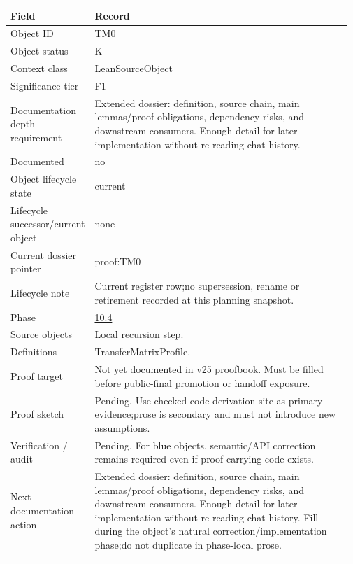 \begin{longtable}{L{0.16\linewidth} L{0.81\linewidth}}
\hline
\textbf{Field} & \textbf{Record}\\
\hline
Object ID & \hyperlink{object-row-TM0}{TM0}\\
\hline\addlinespace[0.20em]
Object status & K\\
\hline\addlinespace[0.20em]
Context class & LeanSourceObject\\
\hline\addlinespace[0.20em]
Significance tier & F1\\
\hline\addlinespace[0.20em]
Documentation depth requirement & Extended dossier: definition, source chain, main lemmas/\allowbreak{}proof obligations, dependency risks, and downstream consumers. Enough detail for later implementation without re-reading chat history.\\
\hline\addlinespace[0.20em]
Documented & no\\
\hline\addlinespace[0.20em]
Object lifecycle state & current\\
\hline\addlinespace[0.20em]
Lifecycle successor/\allowbreak{}current object & none\\
\hline\addlinespace[0.20em]
Current dossier pointer & proof:TM0\\
\hline\addlinespace[0.20em]
Lifecycle note & Current register row;\newline no supersession, rename or retirement recorded at this planning snapshot.\\
\hline\addlinespace[0.20em]
Phase & \hyperlink{phase-row-10-4}{10.4}\\
\hline\addlinespace[0.20em]
Source objects & Local recursion step.\\
\hline\addlinespace[0.20em]
Definitions & TransferMatrixProfile.\\
\hline\addlinespace[0.20em]
Proof target & Not yet documented in v25 proofbook. Must be filled before public-final promotion or handoff exposure.\\
\hline\addlinespace[0.20em]
Proof sketch & Pending. Use checked code derivation site as primary evidence;\newline prose is secondary and must not introduce new assumptions.\\
\hline\addlinespace[0.20em]
Verification /\allowbreak{} audit & Pending. For blue objects, semantic/\allowbreak{}API correction remains required even if proof-carrying code exists.\\
\hline\addlinespace[0.20em]
Next documentation action & Extended dossier: definition, source chain, main lemmas/\allowbreak{}proof obligations, dependency risks, and downstream consumers. Enough detail for later implementation without re-reading chat history. Fill during the object's natural correction/\allowbreak{}implementation phase;\newline do not duplicate in phase-local prose.\\
\hline\addlinespace[0.20em]
\end{longtable}
